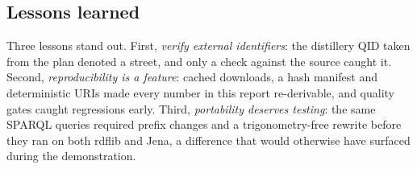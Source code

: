 \subsection{Lessons learned}

Three lessons stand out. First, \emph{verify external identifiers}: the
distillery QID taken from the plan denoted a street, and only a check against
the source caught it. Second, \emph{reproducibility is a feature}: cached
downloads, a hash manifest and deterministic URIs made every number in this
report re-derivable, and quality gates caught regressions early. Third,
\emph{portability deserves testing}: the same SPARQL queries required prefix
changes and a trigonometry-free rewrite before they ran on both rdflib and
Jena, a difference that would otherwise have surfaced during the demonstration.
